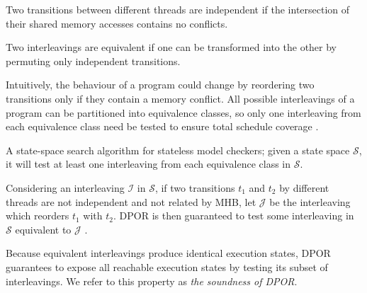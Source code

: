 
\begin{definition}
Two transitions between different threads are independent if the intersection of their shared memory accesses contains no conflicts.
\end{definition}

\begin{definition}
Two interleavings are equivalent if one can be transformed into the other by permuting only independent transitions.
\end{definition}

Intuitively, the behaviour of a program could change by reordering two transitions only if they contain a memory conflict.
All possible interleavings of a program can be partitioned into equivalence classes,
so only one interleaving from each equivalence class need be tested to ensure total schedule coverage \cite{mazurkiewicz}.


\begin{definition}
	A state-space search algorithm for stateless model checkers;
	given a state space $\mathcal{S}$, it will test at least one interleaving from each equivalence class in $\mathcal{S}$.
	\label{def:dpor}
\end{definition}

Considering an interleaving $\mathcal{I}$ in $\mathcal{S}$, if two transitions $t_1$ and $t_2$ by different threads are not independent and not related by MHB, let $\mathcal{J}$ be the interleaving which reorders $t_1$ with $t_2$. DPOR is then guaranteed to test some interleaving in $\mathcal{S}$ equivalent to $\mathcal{J}$ \cite{dpor}.

Because equivalent interleavings produce identical execution states,
DPOR guarantees to expose all reachable execution states by testing its subset of interleavings.
We refer to this property as {\em the soundness of DPOR}.

